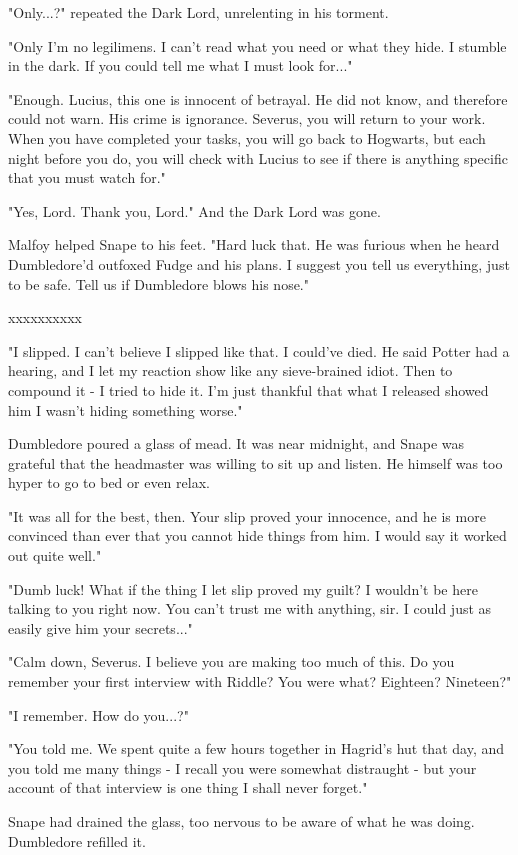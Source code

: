 \documentclass[a4paper,11pt]{article}
\begin{document}
"Only...?" repeated the Dark Lord, unrelenting in his torment.

"Only I'm no legilimens. I can't read what you need or what they hide. I stumble in the dark. If you could tell me what I must look for..."

"Enough. Lucius, this one is innocent of betrayal. He did not know, and therefore could not warn. His crime is ignorance. Severus, you will return to your work. When you have completed your tasks, you will go back to Hogwarts, but each night before you do, you will check with Lucius to see if there is anything specific that you must watch for."

"Yes, Lord. Thank you, Lord." And the Dark Lord was gone.

Malfoy helped Snape to his feet. "Hard luck that. He was furious when he heard Dumbledore'd outfoxed Fudge and his plans. I suggest you tell us everything, just to be safe. Tell us if Dumbledore blows his nose."

xxxxxxxxxx

"I slipped. I can't believe I slipped like that. I could've died. He said Potter had a hearing, and I let my reaction show like any sieve-brained idiot. Then to compound it - I tried to hide it. I'm just thankful that what I released showed him I wasn't hiding something worse."

Dumbledore poured a glass of mead. It was near midnight, and Snape was grateful that the headmaster was willing to sit up and listen. He himself was too hyper to go to bed or even relax.

"It was all for the best, then. Your slip proved your innocence, and he is more convinced than ever that you cannot hide things from him. I would say it worked out quite well."

"Dumb luck! What if the thing I let slip proved my guilt? I wouldn't be here talking to you right now. You can't trust me with anything, sir. I could just as easily give him your secrets..."

"Calm down, Severus. I believe you are making too much of this. Do you remember your first interview with Riddle? You were what? Eighteen? Nineteen?"

"I remember. How do you...?"

"You told me. We spent quite a few hours together in Hagrid's hut that day, and you told me many things - I recall you were somewhat distraught - but your account of that interview is one thing I shall never forget."

Snape had drained the glass, too nervous to be aware of what he was doing. Dumbledore refilled it.
\end{document}
